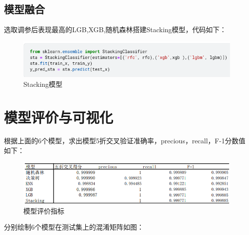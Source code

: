 \subsection{模型融合}
选取调参后表现最高的LGB,XGB,随机森林搭建Stacking模型，代码如下：
\begin{figure}[H]
	\centering
	\includegraphics[scale=0.6,angle=0]{images/13.png}
	\caption{Stacking模型}
	\label{13}
\end{figure}

\section{模型评价与可视化}
根据上面的6个模型，求出模型5折交叉验证准确率，precious，recall，F-1分数值如下：
\begin{figure}[H]
	\centering
	\includegraphics[scale=0.57,angle=0]{images/15.png}
	\caption{模型评价指标}
	\label{15}
\end{figure}
分别绘制6个模型在测试集上的混淆矩阵如图：
